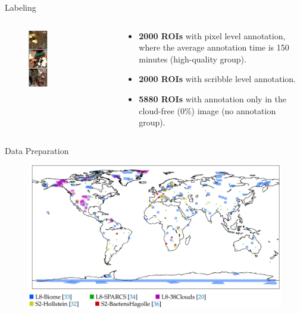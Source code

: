 \documentclass{beamer}
\begin{document}
\begin{frame}{Labeling}
\begin{columns}
	\begin{column}{0.5\textwidth}
		\begin{figure}
		\includegraphics[width=0.32\textwidth]{images/figure_07}
		\end{figure}	
	\end{column}
	\begin{column}{0.5\textwidth}
		\begin{itemize}[<+->]
			\item \textbf{2000 ROIs} with pixel level annotation, where the average annotation time is 150 minutes (high-quality group).
			\item \textbf{2000 ROIs} with scribble level annotation.
			\item \textbf{5880 ROIs} with annotation only in the cloud-free (0\%) image (no annotation group).
		\end{itemize}
	\end{column}
\end{columns}	
\end{frame}



\begin{frame}{Data Preparation}
	\begin{figure}
		\centering
		\includegraphics[width=0.75\linewidth]{images/figure_02}
	\end{figure}
\end{frame}
\end{document}
